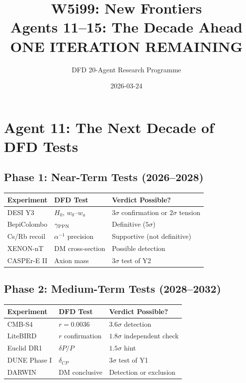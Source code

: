\documentclass[11pt,a4paper]{article}
\title{W5i99: New Frontiers\\[6pt]
\large Agents 11--15: The Decade Ahead\\[6pt]
\normalsize \textbf{ONE ITERATION REMAINING}}
\author{DFD 20-Agent Research Programme}
\date{2026-03-24}
\begin{document}
\maketitle

\section{Agent 11: The Next Decade of DFD Tests}

\begin{tcolorbox}[colback=blue!5!white, colframe=dfdblue, title=\textbf{THE NEXT DECADE: 2026--2036}]

\subsection*{Phase 1: Near-Term Tests (2026--2028)}

\begin{center}
\begin{tabular}{lll}
\toprule
\textbf{Experiment} & \textbf{DFD Test} & \textbf{Verdict Possible?} \\
\midrule
DESI Y3 & $H_0$, $w_0$--$w_a$ & $3\sigma$ confirmation or $2\sigma$ tension \\
BepiColombo & $\gamma_{\rm PPN}$ & Definitive ($5\sigma$) \\
Cs/Rb recoil & $\alpha^{-1}$ precision & Supportive (not definitive) \\
XENON-nT & DM cross-section & Possible detection \\
CASPEr-E II & Axion mass & $3\sigma$ test of Y2 \\
\bottomrule
\end{tabular}
\end{center}

\subsection*{Phase 2: Medium-Term Tests (2028--2032)}

\begin{center}
\begin{tabular}{lll}
\toprule
\textbf{Experiment} & \textbf{DFD Test} & \textbf{Verdict Possible?} \\
\midrule
CMB-S4 & $r = 0.0036$ & $3.6\sigma$ detection \\
LiteBIRD & $r$ confirmation & $1.8\sigma$ independent check \\
Euclid DR1 & $\delta P/P$ & $1.5\sigma$ hint \\
DUNE Phase I & $\delta_{CP}$ & $3\sigma$ test of Y1 \\
DARWIN & DM conclusive & Detection or exclusion \\
\bottomrule
\end{tabular}
\end{center}


\end{tcolorbox}
\end{document}

